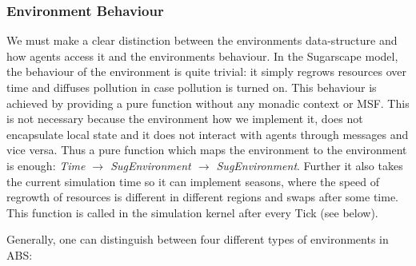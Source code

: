 \subsubsection{Environment Behaviour}
We must make a clear distinction between the environments data-structure and how agents access it and the environments behaviour. In the Sugarscape model, the behaviour of the environment is quite trivial: it simply regrows resources over time and diffuses pollution in case pollution is turned on. This behaviour is achieved by providing a pure function without any monadic context or MSF. This is not necessary because the environment how we implement it, does not encapsulate local state and it does not interact with agents through messages and vice versa. Thus a pure function which maps the environment to the environment is enough: \textit{Time $\rightarrow$ SugEnvironment $\rightarrow$ SugEnvironment}. Further it also takes the current simulation time so it can implement seasons, where the speed of regrowth of resources is different in different regions and swaps after some time. This function is called in the simulation kernel after every Tick (see below).

Generally, one can distinguish between four different types of environments in ABS:

